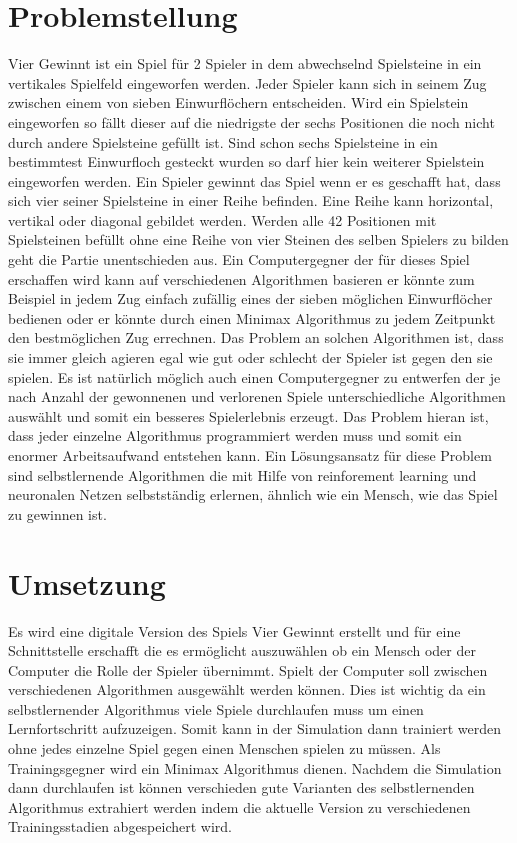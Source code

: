 \documentclass{article}
\begin{document}
\section{Problemstellung}
Vier Gewinnt ist ein Spiel für 2 Spieler in dem abwechselnd Spielsteine in ein vertikales Spielfeld eingeworfen werden. Jeder Spieler kann sich in seinem Zug zwischen einem von sieben Einwurflöchern entscheiden. Wird ein Spielstein eingeworfen so fällt dieser auf die niedrigste der sechs Positionen die noch nicht durch andere Spielsteine gefüllt ist. Sind schon sechs Spielsteine in ein bestimmtest Einwurfloch gesteckt wurden so darf hier kein weiterer Spielstein eingeworfen werden. Ein Spieler gewinnt das Spiel wenn er es geschafft  hat, dass sich vier seiner Spielsteine in einer Reihe befinden. Eine Reihe kann horizontal, vertikal oder diagonal gebildet werden. Werden alle 42 Positionen mit Spielsteinen befüllt ohne eine Reihe von vier Steinen des selben Spielers zu bilden geht die Partie unentschieden aus.
Ein Computergegner der für dieses Spiel erschaffen wird kann auf verschiedenen Algorithmen basieren er könnte zum Beispiel in jedem Zug einfach zufällig eines der sieben möglichen Einwurflöcher bedienen oder er könnte durch einen Minimax Algorithmus zu jedem Zeitpunkt den bestmöglichen Zug errechnen. Das Problem an solchen Algorithmen ist, dass sie immer gleich agieren egal wie gut oder schlecht der Spieler ist gegen den sie spielen. 
Es ist natürlich möglich auch einen Computergegner zu entwerfen der je nach Anzahl der gewonnenen und verlorenen Spiele unterschiedliche Algorithmen auswählt und somit ein besseres Spielerlebnis erzeugt. Das Problem hieran ist, dass jeder einzelne Algorithmus programmiert werden muss und somit ein enormer Arbeitsaufwand entstehen kann.
Ein Lösungsansatz für diese Problem sind selbstlernende Algorithmen die mit Hilfe von reinforement learning und neuronalen Netzen selbstständig erlernen, ähnlich wie ein Mensch, wie das Spiel zu gewinnen ist.

\section{Umsetzung}

Es wird eine digitale Version des Spiels Vier Gewinnt erstellt und für eine Schnittstelle erschafft die es ermöglicht auszuwählen ob ein Mensch oder der Computer die Rolle der Spieler übernimmt. Spielt der Computer soll zwischen verschiedenen Algorithmen ausgewählt werden können. Dies ist wichtig da ein selbstlernender Algorithmus viele Spiele durchlaufen muss um einen Lernfortschritt aufzuzeigen. Somit kann in der Simulation dann trainiert werden ohne jedes einzelne Spiel gegen einen Menschen spielen zu müssen. Als Trainingsgegner wird ein Minimax Algorithmus dienen. Nachdem die Simulation dann durchlaufen ist können verschieden gute Varianten des selbstlernenden Algorithmus extrahiert werden indem die aktuelle Version zu verschiedenen Trainingsstadien abgespeichert wird.
\end{document}
